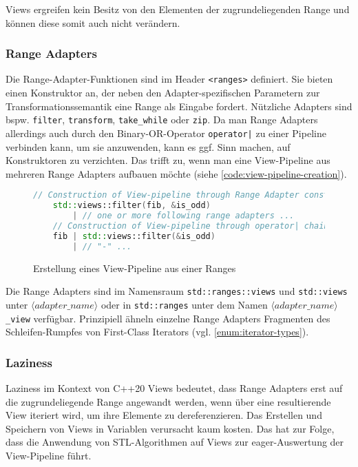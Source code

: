\documentclass[runningheads]{llncs}
\begin{document}
Views ergreifen kein Besitz von den Elementen der zugrundeliegenden Range und können diese somit auch nicht verändern.

\subsubsection{Range Adapters}

Die Range-Adapter-Funktionen sind im Header \texttt{<ranges>} definiert.
Sie bieten einen Konstruktor an, der neben den Adapter-spezifischen Parametern zur Transformationssemantik eine Range als Eingabe fordert.
Nützliche Adapters sind bspw. \texttt{filter}, \texttt{transform}, \texttt{take\_while} oder \texttt{zip}.
Da man Range Adapters allerdings auch durch den Binary-OR-Operator \texttt{operator|} zu einer Pipeline verbinden kann, um sie anzuwenden, kann es ggf. Sinn machen, auf Konstruktoren zu verzichten.
Das trifft zu, wenn man eine View-Pipeline aus mehreren Range Adapters aufbauen möchte (siehe \autoref{code:view-pipeline-creation}).

\begin{figure}[H]
	\vspace{-1em}
	\caption{Erstellung eines View-Pipeline aus einer Ranges}
	\label{code:view-pipeline-creation}

	\begin{lstlisting}[language=C++]
	// Construction of View-pipeline through Range Adapter constructor
	std::views::filter(fib, &is_odd)
		| // one or more following range adapters ...
	// Construction of View-pipeline through operator| chaining
	fib | std::views::filter(&is_odd)
		| // "-" ...
	\end{lstlisting}
	\vspace{-1.5em}
\end{figure}

\noindent Die Range Adapters sind im Namensraum \texttt{std::ranges::views} und \texttt{std::views} unter \texttt{$\langle adapter\_name\rangle$} oder in \texttt{std::ranges} unter dem Namen \texttt{$\langle adapter\_name\rangle$\_view} verfügbar.
Prinzipiell ähneln einzelne Range Adapters Fragmenten des Schleifen-Rumpfes von First-Class Iterators (vgl. \ref{enum:iterator-types}).

\subsubsection{Laziness}

Laziness im Kontext von C++20 Views bedeutet, dass Range Adapters erst auf die zugrundeliegende Range angewandt werden, wenn über eine resultierende View iteriert wird, um ihre Elemente zu dereferenzieren.
Das Erstellen und Speichern von Views in Variablen verursacht kaum kosten.
Das hat zur Folge, dass die Anwendung von STL-Algorithmen auf Views zur eager-Auswertung der View-Pipeline führt.
\end{document}
